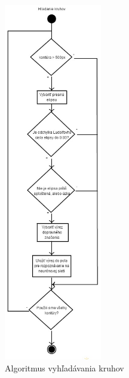 \documentclass[12pt]{article}
\begin{document}
\begin{figure}[p]
\centering
\includegraphics[width=0.38\textwidth,natwidth=318,natheight=1164]{hladanie_kruhov.jpg}
\vspace{-20pt}
\caption{Algoritmus vyhľadávania kruhov}
\vspace{-10pt}
\label{hladanie_kruhov}
\end{figure}
\end{document}
